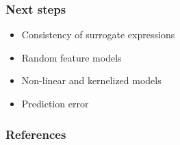 \documentclass{beamer}
\begin{document}
\begin{frame}
  \frametitle{Next steps}
  \begin{itemize}
  \item Consistency of surrogate expressions\\[3mm]\pause
  \item Random feature models\\[3mm]\pause
  \item Non-linear and kernelized models\\[3mm]\pause
  \item Prediction error
  \end{itemize}
\end{frame}

\begin{frame}
  \frametitle{References}
  \footnotesize


\end{frame}
\end{document}
